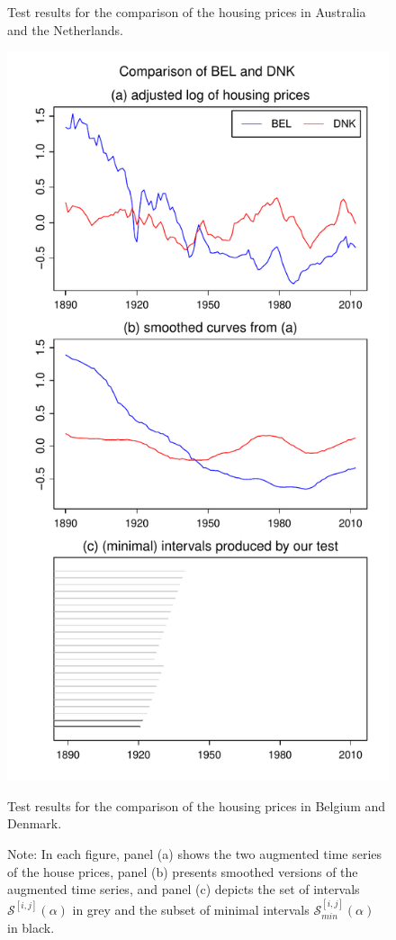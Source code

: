 \documentclass[a4paper,12pt]{article}
\begin{document}
\begin{figure}[p!]
\begin{minipage}[t]{0.49\textwidth}
\caption{Test results for the comparison of the housing prices in Australia and the Netherlands.}\label{fig:hp:Australia:Netherlands}
\end{minipage}
\hspace{0.25cm}
\begin{minipage}[t]{0.49\textwidth}
\includegraphics[width=\textwidth]{Plots/hp_BEL_vs_DNK}
\caption{Test results for the comparison of the housing prices in Belgium and Denmark.}\label{fig:hp:Belgium:Denmark}
\end{minipage}
\caption*{Note: In each figure, panel (a) shows the two augmented time series of the house prices, panel (b) presents smoothed versions of the augmented time series, and panel (c) depicts the set of intervals $\mathcal{S}^{[i,j]}(\alpha)$ in grey and the subset of minimal intervals $\mathcal{S}^{[i,j]}_{min}(\alpha)$ in black.}
\end{figure}
\end{document}

